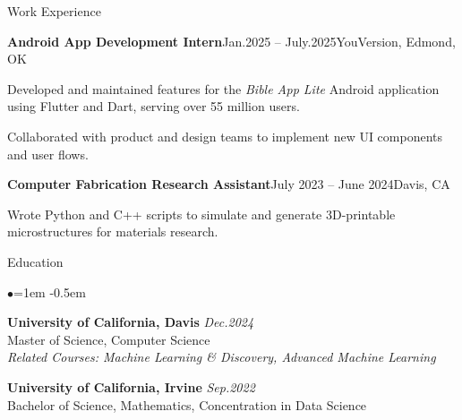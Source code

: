 \documentclass{resume} %
\begin{document}
	
	
	
        \begin{rSection}{Work Experience}

            \begin{rSubsection}{\textbf{Android App Development Intern}}{Jan.2025 – July.2025}{YouVersion, Edmond, OK}{}
                \item Developed and maintained features for the \textit{Bible App Lite} Android application using Flutter and Dart, serving over 55 million users.
                \item Collaborated with product and design teams to implement new UI components and user flows.
            \end{rSubsection}
        
            \begin{rSubsection}{\textbf{Computer Fabrication Research Assistant}}{July 2023 – June 2024}{Davis, CA}{}
                \item Wrote Python and C++ scripts to simulate and generate 3D-printable microstructures for materials research.
            \end{rSubsection}
        
        \end{rSection}
 
	\begin{rSection}{Education}
		
		\begin{list}{$\bullet$}{\leftmargin=1em} %
			\itemsep -0.5em \vspace{0em} %
			\item{
			{\bf University of California, Davis} \hfill\textit{Dec.2024} \\
			Master of Science, Computer Science \\
            \textit{Related Courses: Machine Learning \& Discovery, Advanced Machine Learning} \\
            \vspace{-0.5em}
		}

			\item{{\bf University of California, Irvine} \hfill\textit {Sep.2022} \\
				Bachelor of Science, Mathematics, Concentration in Data Science\\
				\vspace{-0.5em}\small
			}
			
		\end{list}
	\end{rSection}
	
\end{document}
